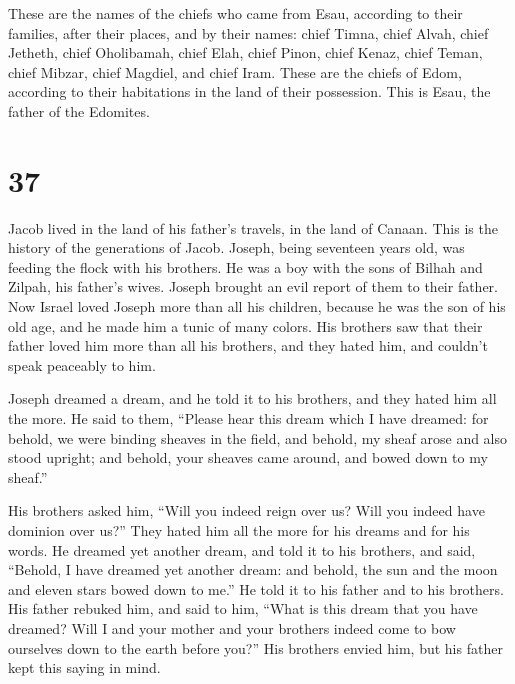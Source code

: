  These are the names of the chiefs who came from Esau,
according to their families, after their places, and by their names:
chief Timna, chief Alvah, chief Jetheth,  chief
Oholibamah, chief Elah, chief Pinon,  chief Kenaz, chief
Teman, chief Mibzar,  chief Magdiel, and chief Iram.
These are the chiefs of Edom, according to their habitations in the land
of their possession. This is Esau, the father of the Edomites.

\hypertarget{section-36}{%
\section{37}\label{section-36}}

 Jacob lived in the land of his father's travels, in the
land of Canaan.  This is the history of the generations of
Jacob. Joseph, being seventeen years old, was feeding the flock with his
brothers. He was a boy with the sons of Bilhah and Zilpah, his father's
wives. Joseph brought an evil report of them to their father.
 Now Israel loved Joseph more than all his children,
because he was the son of his old age, and he made him a tunic of many
colors.  His brothers saw that their father loved him more
than all his brothers, and they hated him, and couldn't speak peaceably
to him.

 Joseph dreamed a dream, and he told it to his brothers,
and they hated him all the more.  He said to them,
``Please hear this dream which I have dreamed:  for
behold, we were binding sheaves in the field, and behold, my sheaf arose
and also stood upright; and behold, your sheaves came around, and bowed
down to my sheaf.''

 His brothers asked him, ``Will you indeed reign over us?
Will you indeed have dominion over us?'' They hated him all the more for
his dreams and for his words.  He dreamed yet another
dream, and told it to his brothers, and said, ``Behold, I have dreamed
yet another dream: and behold, the sun and the moon and eleven stars
bowed down to me.''  He told it to his father and to his
brothers. His father rebuked him, and said to him, ``What is this dream
that you have dreamed? Will I and your mother and your brothers indeed
come to bow ourselves down to the earth before you?'' 
His brothers envied him, but his father kept this saying in mind.

